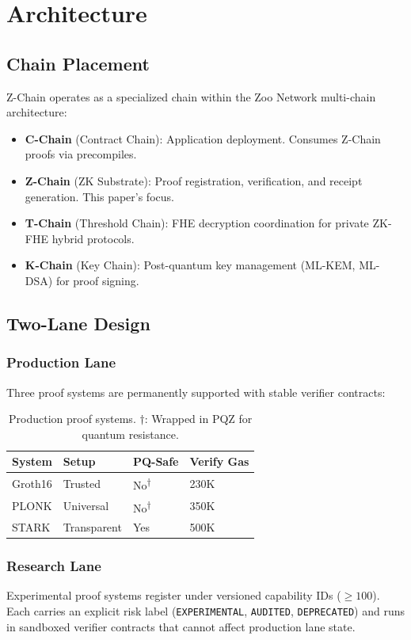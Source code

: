 \section{Architecture}


\subsection{Chain Placement}

Z-Chain operates as a specialized chain within the Zoo Network multi-chain architecture:

\begin{itemize}
\item \textbf{C-Chain} (Contract Chain): Application deployment. Consumes Z-Chain proofs via precompiles.
\item \textbf{Z-Chain} (ZK Substrate): Proof registration, verification, and receipt generation. This paper's focus.
\item \textbf{T-Chain} (Threshold Chain): FHE decryption coordination for private ZK-FHE hybrid protocols.
\item \textbf{K-Chain} (Key Chain): Post-quantum key management (ML-KEM, ML-DSA) for proof signing.
\end{itemize}

\subsection{Two-Lane Design}

\subsubsection{Production Lane}

Three proof systems are permanently supported with stable verifier contracts:

\begin{table}[h]
\centering
\begin{tabular}{llll}
\toprule
\textbf{System} & \textbf{Setup} & \textbf{PQ-Safe} & \textbf{Verify Gas} \\
\midrule
Groth16 & Trusted & No\textsuperscript{$\dagger$} & 230K \\
PLONK & Universal & No\textsuperscript{$\dagger$} & 350K \\
STARK & Transparent & Yes & 500K \\
\bottomrule
\end{tabular}
\caption{Production proof systems. $\dagger$: Wrapped in PQZ for quantum resistance.}
\end{table}

\subsubsection{Research Lane}

Experimental proof systems register under versioned capability IDs ($\geq 100$). Each carries an explicit risk label (\texttt{EXPERIMENTAL}, \texttt{AUDITED}, \texttt{DEPRECATED}) and runs in sandboxed verifier contracts that cannot affect production lane state.

